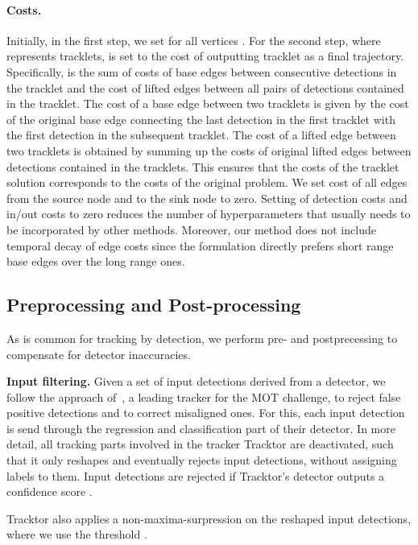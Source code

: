 \documentclass{article}
\begin{document}
\paragraph{Costs.}
Initially, in the first step, we set  for all vertices .
For the second step, where  represents tracklets,  is set to the cost of outputting tracklet  as a final trajectory. 
Specifically,  is the sum of costs of base edges between consecutive detections in the tracklet and the cost of lifted edges between all pairs of detections contained in the tracklet.
The cost of a base edge between two tracklets is given by the cost of the original base edge connecting the last detection in the first tracklet with the first detection in the subsequent tracklet.
The cost of a lifted edge between two tracklets is obtained by summing up the costs of original lifted edges between detections contained in the tracklets.
This ensures that the costs of the tracklet solution corresponds to the costs of the original problem. We set cost of all edges from the source node  and to the sink node  to zero. Setting of detection costs and in/out costs to zero reduces the number of hyperparameters that  usually needs to be incorporated by other methods. Moreover, our method does not include temporal decay of edge costs since the formulation directly prefers short range base edges over the long range ones.



\subsection{Preprocessing and Post-processing}
\label{sec:pre_post_processing}
As is common for tracking by detection, we perform pre- and  postprecessing to compensate for detector inaccuracies.


\textbf{Input filtering.} Given a set of input detections derived from a detector, we follow the approach of~\cite{bergmann2019tracking}, a leading tracker for the MOT challenge, to reject false positive detections and to correct misaligned ones.
For this, each input detection is send through the regression and classification part of their detector.
In more detail, all tracking parts involved in the tracker Tracktor \cite{bergmann2019tracking} are deactivated, such that it only reshapes and eventually rejects input  detections, without assigning labels to them.
Input detections are rejected if  Tracktor's detector outputs a confidence score .

Tracktor also applies a non-maxima-surpression on the reshaped input detections, where we use the threshold .
\end{document}
